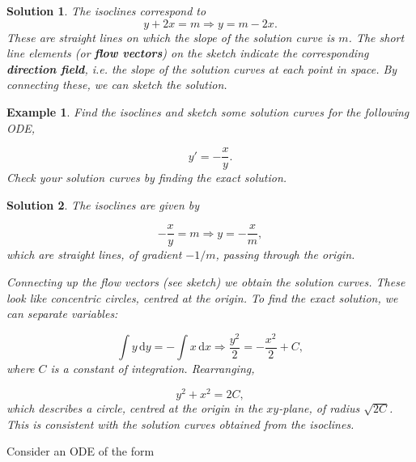 \documentclass[a4paper]{report}
\newtheorem{example}{Example}[chapter]
\newtheorem*{solution}{Solution}
\begin{document}
\begin{solution}
The isoclines correspond to 
\begin{displaymath}
y+2x =m \Longrightarrow y=m-2x.
\end{displaymath}
\noindent These are straight lines on which the slope of the solution curve is $m$. The short line elements (or {\bf flow vectors}) on the sketch indicate the corresponding {\bf direction field}, i.e. the slope of the solution curves at each point in space. By connecting these, we can sketch the solution.

\end{solution}

\begin{example}
\label{ex:first:iso2}
Find the isoclines and sketch some solution curves for the following ODE,

\begin{displaymath}
y' =-\frac{x}{y}.
\end{displaymath}
\noindent Check your solution curves by finding the exact solution.
\end{example}

\begin{solution}
The isoclines are given by

\begin{displaymath}
-\frac{x}{y} = m \Longrightarrow y = -\frac{x}{m},
\end{displaymath}
\noindent which are straight lines, of gradient $-1/m$, passing through the origin. 


\noindent Connecting up the flow vectors (see sketch) we obtain the solution curves. These look like concentric circles, centred at the origin. To find the exact solution, we can separate variables:

\begin{displaymath}
\int y\,\mathrm{d}y = -\int x \,\mathrm{d}x \Longrightarrow \frac{y^2}{2} = - \frac{x^2}{2}+C,
\end{displaymath}
\noindent where $C$ is a constant of integration. Rearranging,

\begin{displaymath}
y^2+x^2 = 2C, 
\end{displaymath}
\noindent which describes a circle, centred at the origin in the $xy$-plane, of radius $\sqrt{2C}$. This is consistent with the solution curves obtained from the isoclines. 

\end{solution}

 Consider an ODE of the form
\end{document}
